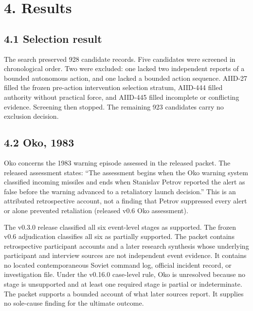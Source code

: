 \documentclass[11pt]{article}
\begin{document}
\section*{4. Results}

\subsection*{4.1 Selection result}

The search preserved 928 candidate records. Five candidates were screened in chronological order. Two were excluded: one lacked two independent reports of a bounded autonomous action, and one lacked a bounded action sequence. AIID-27 filled the frozen pre-action intervention selection stratum, AIID-444 filled authority without practical force, and AIID-445 filled incomplete or conflicting evidence. Screening then stopped. The remaining 923 candidates carry no exclusion decision.

\subsection*{4.2 Oko, 1983}

Oko concerns the 1983 warning episode assessed in the released packet. The released assessment states: “The assessment begins when the Oko warning system classified incoming missiles and ends when Stanislav Petrov reported the alert as false before the warning advanced to a retaliatory launch decision.” This is an attributed retrospective account, not a finding that Petrov suppressed every alert or alone prevented retaliation (released v0.6 Oko assessment).

The v0.3.0 release classified all six event-level stages as supported. The frozen v0.6 adjudication classifies all six as partially supported. The packet contains retrospective participant accounts and a later research synthesis whose underlying participant and interview sources are not independent event evidence. It contains no located contemporaneous Soviet command log, official incident record, or investigation file. Under the v0.16.0 case-level rule, Oko is unresolved because no stage is unsupported and at least one required stage is partial or indeterminate. The packet supports a bounded account of what later sources report. It supplies no sole-cause finding for the ultimate outcome.
\end{document}

